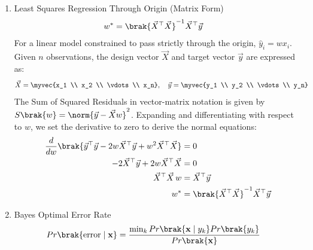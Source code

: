 \begin{enumerate}[label=\thesubsection.\arabic*, ref=\thesubsection.\theenumi]
\item Least Squares Regression Through Origin (Matrix Form)
\begin{align}
	w^* &= \brak{\vec{X}^\top \vec{X}}^{-1} \vec{X}^\top \vec{y} \label{eq:DA2025-least_squares_matrix}
\end{align}
\solution
For a linear model constrained to pass strictly through the origin, $\hat{y}_i = w x_i$. Given $n$ observations, the design vector $\vec{X}$ and target vector $\vec{y}$ are expressed as:
\begin{align}
	\vec{X} &= \myvec{x_1 \\ x_2 \\ \vdots \\ x_n}, \quad \vec{y} = \myvec{y_1 \\ y_2 \\ \vdots \\ y_n}
\end{align}
The Sum of Squared Residuals in vector-matrix notation is given by $S\brak{w} = \norm{\vec{y} - \vec{X}w}^2$. Expanding and differentiating with respect to $w$, we set the derivative to zero to derive the normal equations:
\begin{align}
	\frac{d}{dw} \brak{\vec{y}^\top \vec{y} - 2 w \vec{X}^\top \vec{y} + w^2 \vec{X}^\top \vec{X}} &= 0
	\\
	-2 \vec{X}^\top \vec{y} + 2 w \vec{X}^\top \vec{X} &= 0
	\\
	\vec{X}^\top \vec{X} \, w &= \vec{X}^\top \vec{y}
	\\
	w^* &= \brak{\vec{X}^\top \vec{X}}^{-1} \vec{X}^\top \vec{y}
\end{align}
	\item Bayes Optimal Error Rate
	\begin{align}
		Pr\brak{\text{error} \mid \mathbf{x}} &= \frac{\min_k Pr\brak{\mathbf{x} \mid y_k} Pr\brak{y_k}}{Pr\brak{\mathbf{x}}} \label{eq:DA2025-bayes_error}
	\end{align}
	

\end{enumerate}
